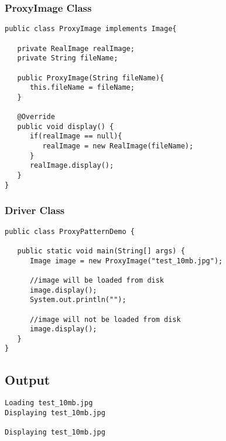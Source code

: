 \subsubsection{ProxyImage Class}

\begin{verbatim}
public class ProxyImage implements Image{

   private RealImage realImage;
   private String fileName;

   public ProxyImage(String fileName){
      this.fileName = fileName;
   }

   @Override
   public void display() {
      if(realImage == null){
         realImage = new RealImage(fileName);
      }
      realImage.display();
   }
}
\end{verbatim}

\subsubsection{Driver Class}

\begin{verbatim}
public class ProxyPatternDemo {
	
   public static void main(String[] args) {
      Image image = new ProxyImage("test_10mb.jpg");

      //image will be loaded from disk
      image.display(); 
      System.out.println("");
      
      //image will not be loaded from disk
      image.display(); 	
   }
}
\end{verbatim}

\subsection{Output}

\begin{verbatim}
Loading test_10mb.jpg
Displaying test_10mb.jpg

Displaying test_10mb.jpg
\end{verbatim}
